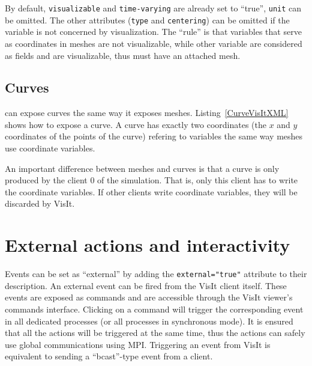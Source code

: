 By default, \texttt{visualizable} and \texttt{time-varying} are already set to ``true'', \texttt{unit} can be omitted.
The other attributes (\texttt{type} and \texttt{centering}) can be omitted if the variable is not concerned by
visualization.
The ``rule'' is that variables that serve as coordinates in meshes are not visualizable, while
other variable are considered as fields and are visualizable, thus must have an attached mesh.

\subsection{Curves}

\Damaris{} can expose curves the same way it exposes meshes. Listing~\ref{CurveVisItXML}
shows how to expose a curve. A curve has exactly two coordinates (the $x$ and $y$ coordinates
of the points of the curve) refering to variables the same way meshes use coordinate variables.

An important difference between meshes and curves is that a curve is only produced by
the client 0 of the simulation. That is, only this client has to write the coordinate variables.
If other clients write coordinate variables, they will be discarded by VisIt.

\noindent\begin{minipage}{\textwidth}
\vspace{0.5cm}

\end{minipage}

\section{External actions and interactivity}

Events can be set as ``external'' by adding the \texttt{external="true"} attribute to their
description. An external event can be fired from the VisIt client itself. These events are exposed as commands
and are accessible through the VisIt viewer's commands interface.
Clicking on a command will trigger the corresponding event in all dedicated processes (or all processes
in synchronous mode). It is ensured that all the actions will be triggered at the same time, thus
the actions can safely use global communications using MPI.
Triggering an event from VisIt is equivalent to sending a ``bcast''-type event from a client.